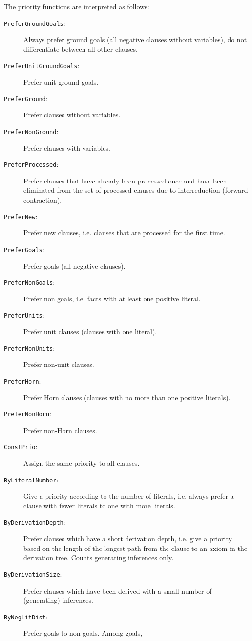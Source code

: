 \documentclass{article}
\begin{document}
The priority functions are interpreted as follows:

\begin{description}
\item[\texttt{PreferGroundGoals}:] Always prefer ground goals (all
  negative clauses without variables), do not differentiate between
  all other clauses.
\item[\texttt{PreferUnitGroundGoals}:] Prefer unit ground goals.
\item[\texttt{PreferGround}:] Prefer clauses without variables.
\item[\texttt{PreferNonGround}:] Prefer clauses with variables.
\item[\texttt{PreferProcessed}:] Prefer clauses that have already been
  processed once and have been eliminated from the set of processed
  clauses due to interreduction (forward contraction).
\item[\texttt{PreferNew}:] Prefer new clauses, i.e. clauses that are
  processed for the first time.
\item[\texttt{PreferGoals}:] Prefer goals (all negative clauses).
\item[\texttt{PreferNonGoals}:] Prefer non goals, i.e. facts with at
  least one positive literal.
\item[\texttt{PreferUnits}:] Prefer unit clauses (clauses with one
  literal).
\item[\texttt{PreferNonUnits}:] Prefer non-unit clauses.
\item[\texttt{PreferHorn}:] Prefer Horn clauses (clauses with no more
  than one positive literals).
\item[\texttt{PreferNonHorn}:] Prefer non-Horn clauses. 
\item[\texttt{ConstPrio}:] Assign the same priority to all clauses.
\item[\texttt{ByLiteralNumber}:] Give a priority according to the
  number of literals, i.e. always prefer a clause with fewer literals
  to one with more literals.
\item[\texttt{ByDerivationDepth}:] Prefer clauses which have a short
  derivation depth, i.e. give a priority based on the length of the
  longest path from the clause to an axiom in the derivation
  tree. Counts generating inferences only.
\item[\texttt{ByDerivationSize}:] Prefer clauses which have been
  derived with a small number of (generating) inferences.
\item[\texttt{ByNegLitDist}:] Prefer goals to non-goals. Among goals,

\end{description}
\end{document}
